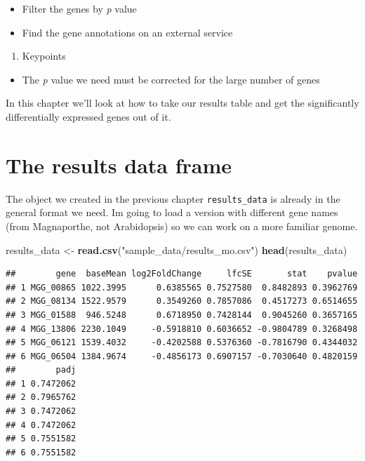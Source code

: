 \documentclass[]{book}
\newenvironment{Shaded}{\begin{snugshade}}{\end{snugshade}}
\newcommand{\KeywordTok}[1]{\textcolor[rgb]{0.13,0.29,0.53}{\textbf{#1}}}
\newcommand{\NormalTok}[1]{#1}
\newcommand{\StringTok}[1]{\textcolor[rgb]{0.31,0.60,0.02}{#1}}
\providecommand{\tightlist}{%
  \setlength{\itemsep}{0pt}\setlength{\parskip}{0pt}}
\begin{document}
\begin{itemize}
\tightlist
\item
  Filter the genes by \emph{p} value
\item
  Find the gene annotations on an external service
\end{itemize}

\begin{enumerate}
\def\labelenumi{\arabic{enumi}.}
\setcounter{enumi}{2}
\tightlist
\item
  Keypoints
\end{enumerate}

\begin{itemize}
\tightlist
\item
  The \emph{p} value we need must be corrected for the large number of genes
\end{itemize}

In this chapter we'll look at how to take our results table and get the significantly differentially expressed genes out of it.

\hypertarget{the-results-data-frame}{%
\section{The results data frame}\label{the-results-data-frame}}

The object we created in the previous chapter \texttt{results\_data} is already in the general format we need. Im going to load a version with different gene names (from Magnaporthe, not Arabidopsis) so we can work on a more familiar genome.

\begin{Shaded}
\begin{Highlighting}[]
\NormalTok{results_data <-}\StringTok{ }\KeywordTok{read.csv}\NormalTok{(}\StringTok{"sample_data/results_mo.csv"}\NormalTok{)}
\KeywordTok{head}\NormalTok{(results_data)}
\end{Highlighting}
\end{Shaded}

\begin{verbatim}
##        gene  baseMean log2FoldChange     lfcSE       stat    pvalue
## 1 MGG_00865 1022.3995      0.6385565 0.7527580  0.8482893 0.3962769
## 2 MGG_08134 1522.9579      0.3549260 0.7857086  0.4517273 0.6514655
## 3 MGG_01588  946.5248      0.6718950 0.7428144  0.9045260 0.3657165
## 4 MGG_13806 2230.1049     -0.5918810 0.6036652 -0.9804789 0.3268498
## 5 MGG_06121 1539.4032     -0.4202588 0.5376360 -0.7816790 0.4344032
## 6 MGG_06504 1384.9674     -0.4856173 0.6907157 -0.7030640 0.4820159
##        padj
## 1 0.7472062
## 2 0.7965762
## 3 0.7472062
## 4 0.7472062
## 5 0.7551582
## 6 0.7551582
\end{verbatim}
\end{document}
